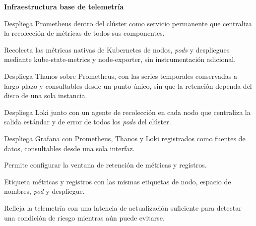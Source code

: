 \noindent\textbf{Infraestructura base de telemetría}
\begin{description}
\setlength{\itemsep}{4pt}
  \item[R1-01] Despliega Prometheus dentro del clúster como servicio permanente que centraliza la recolección de métricas de todos sus componentes.
  \item[R1-02] Recolecta las métricas nativas de Kubernetes de nodos, \emph{pods} y despliegues mediante kube-state-metrics y node-exporter, sin instrumentación adicional.
  \item[R1-03] Despliega Thanos sobre Prometheus, con las series temporales conservadas a largo plazo y consultables desde un punto único, sin que la retención dependa del disco de una sola instancia.
  \item[R1-04] Despliega Loki junto con un agente de recolección en cada nodo que centraliza la salida estándar y de error de todos los \emph{pods} del clúster.
  \item[R1-05] Despliega Grafana con Prometheus, Thanos y Loki registrados como fuentes de datos, consultables desde una sola interfaz.
  \item[R1-06] Permite configurar la ventana de retención de métricas y registros.
  \item[R1-07] Etiqueta métricas y registros con las mismas etiquetas de nodo, espacio de nombres, \emph{pod} y despliegue.
  \item[R1-08] Refleja la telemetría con una latencia de actualización suficiente para detectar una condición de riesgo mientras aún puede evitarse.
\end{description}

